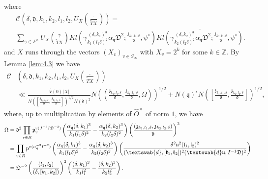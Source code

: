 \documentclass[a4paper,11pt]{amsart}
\theoremstyle{definition}
\newcommand{\Z}{\mathbb{Z}}
\begin{document}
where
\begin{align*}&\mathscr{C}\left(\delta,\mathfrak{d},k_1,k_2,l_1,l_2,U_X(\frac{\cdot}{\tilde{T}X} )\right) =\\ &\sum_{\gamma \in F^{\times}}U_X\left(\frac{\gamma}{\tilde{T}X}\right)Kl\left(\gamma\frac{(\delta,k_1)^3}{k_1(l_1\delta)^2}\alpha_{\mathfrak{q}}\mathfrak{D}^2;\frac{\mathfrak{z}_{k_1,l_1,\delta}}{\mathfrak{d}},\psi^{\circ}\right)\overline{Kl\left(\gamma\frac{(\delta,k_2)^3}{k_2\left({l_2\delta}\right)^{2}}\alpha_{\mathfrak{q}}\mathfrak{D}^2;\frac{\mathfrak{z}_{k_2,l_2,\delta}}{\mathfrak{d}},\psi^{\circ}\right)}.\end{align*}
and $X$ runs through the vectors $(X_v)_{v\in S_{\infty}}$ with $X_v = 2^k$ for some $k\in \Z$.
By Lemma \ref{lem:4.3} we have 
\begin{align*}\mathscr{C}&\left(\delta,\mathfrak{d},k_1,k_2,l_1,l_2,U_{X}(\frac{\cdot}{\tilde{T}X})\right) \\&\ll  \frac{\widehat{V}(0)\vert{X}\vert  }{N([\frac{\mathfrak{z}_{k_1,l_1,\delta}}{\mathfrak{d}},\frac{\mathfrak{z}_{k_2,l_2,\delta}}{\mathfrak{d}}])^{1/2}N(\mathfrak{d})^2} N\left((\frac{\mathfrak{z}_{k_1,l_1,\delta}}{\mathfrak{d}},\frac{\mathfrak{z}_{k_1,l_1,\delta}}{\mathfrak{d}},\Omega)\right)^{1/2}  +   N(\mathfrak{q})^{\epsilon}N\left([\frac{\mathfrak{z}_{k_1,l_1,\delta}}{\mathfrak{d}},\frac{\mathfrak{z}_{k_2,l_2,\delta}}{\mathfrak{d}}]\right)^{1/2},
\end{align*}
where, up to multiplication by elements of $\widehat O^{\times}$ of norm $1$, we have \begin{align*}\Omega &= \mathfrak{d}^{2}\prod_{v\in R}\mathfrak{p}_v^{v(J^{-3}I\mathfrak{D}^{-3})}\left(\frac{\alpha_{\mathfrak{q}}(\delta,k_1)^3}{k_1(l_1\delta)^2}-\frac{\alpha_{\mathfrak{q}}(\delta,k_2)^3}{k_2(l_2\delta)^2}\right)\left(\frac{(\mathfrak{z}_{k_1,l_1,\delta},\mathfrak{z}_{k_2,l_2,\delta})}{\mathfrak{d}}\right)^2 
\\&= \prod_{v\in R}\mathfrak{p}^{v(\alpha_{\mathfrak{q}}^{-3}I^{-2})}\left(\frac{\alpha_{\mathfrak{q}}(\delta,k_1)^3}{k_1(l_1\delta)^2}-\frac{\alpha_{\mathfrak{q}}(\delta,k_2)^3}{k_2(l_2\delta)^2}\right)\left(\frac{\delta^2 \mathfrak{u}^2(\mathfrak{l}_1,\mathfrak{l}_2)^2}{(\textswab{d},[\mathfrak{k}_1,\mathfrak{k}_2])^2(\textswab{d}\mathfrak{u},I^{-1}\mathfrak{D})^2}\right)\\ &=\mathfrak{D}^{-2}\left(\frac{(l_1,l_2)}{(\delta,[k_1,k_2])}\right)^2\left(\frac{(\delta,k_1)^3}{k_1l_1^2}-\frac{(\delta,k_2)^3}{k_2l_2^2}\right). \end{align*}
\end{document}
